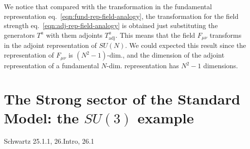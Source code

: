 \documentclass[TheoreticalPhy_ModB.tex]{subfiles}
\begin{document}
We notice that compared with the transformation in the fundamental representation eq.~\eqref{eqn:fund-rep-field-analogy}, the transformation for the field strength eq.~\eqref{eqn:adj-rep-field-analogy} is obtained just substituting the generators $T^a$ with them adjoints $T^a_{\text{adj}}$. This means that the field $F_{\mu\nu}$ transforms in the adjoint representation of $SU(N)$.
We could expected this result since the representation of $\hat F_{\mu\nu}$ is $(N^2-1)$-dim., and the dimension of the adjoint representation of a fundamental $N$-dim. representation has $N^2-1$ dimensions. 

\section{The Strong sector of the Standard Model: the $SU(3)$ example}
\textsf{Schwartz 25.1.1, 26.Intro, 26.1}\\
\end{document}
